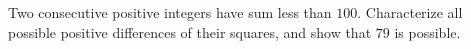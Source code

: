 Two consecutive positive integers have sum less than $100$. Characterize all possible positive differences of their squares, and show that $79$ is possible.
